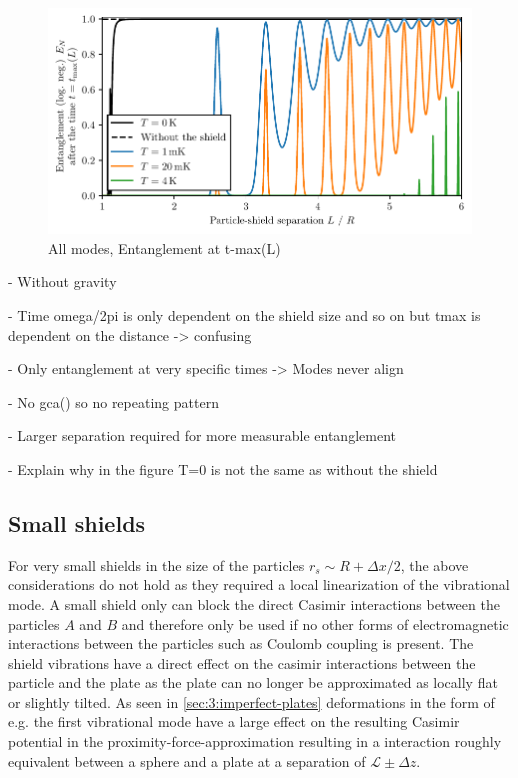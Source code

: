 \begin{figure}[!htbp]
  \centering
  \includegraphics[width=\textwidth]{./../figures/vibrations/all-modes-entanglement-L-t-max.pdf}
  \caption{All modes, Entanglement at t-max(L)}
\end{figure}

- Without gravity

- Time omega/2pi is only dependent on the shield size and so on but tmax is dependent on the distance -> confusing

- Only entanglement at very specific times -> Modes never align

- No gca() so no repeating pattern

- Larger separation required for more measurable entanglement

- Explain why in the figure T=0 is not the same as without the shield


\subsection{Small shields}
For very small shields in the size of the particles $r_s \sim R + \Delta x / 2$, the above considerations do not hold as they required a local linearization of the vibrational mode.
A small shield only can block the direct Casimir interactions between the particles $A$ and $B$ and therefore only be used if no other forms of electromagnetic interactions between the particles such as Coulomb coupling is present.
The shield vibrations have a direct effect on the casimir interactions between the particle and the plate as the plate can no longer be approximated as locally flat or slightly tilted.
As seen in \cref{sec:3:imperfect-plates} deformations in the form of e.g. the first vibrational mode have a large effect on the resulting Casimir potential in the proximity-force-approximation resulting in a interaction roughly equivalent between a sphere and a plate at a separation of $\mathscr{L} \pm \Delta z$. 
